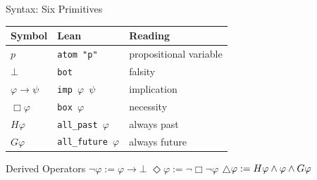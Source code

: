 \documentclass[aspectratio=169,11pt]{beamer}
\newcommand{\nec}{\Box}
\newcommand{\poss}{\Diamond}
\newcommand{\allpast}{H}
\newcommand{\allfuture}{G}
\newcommand{\always}{\ensuremath \raisebox{-1.3pt}{$\triangle$}}
\newcommand{\imp}{\rightarrow}
\newcommand{\falsum}{\bot}
\begin{document}
\begin{frame}{Syntax: Six Primitives}

\begin{center}
\begin{tabular}{lll}
\toprule
\textbf{Symbol} & \textbf{Lean} & \textbf{Reading} \\
\midrule
$p$ & \texttt{atom "p"} & propositional variable \\
$\falsum$ & \texttt{bot} & falsity \\
$\varphi \imp \psi$ & \texttt{imp $\varphi$ $\psi$} & implication \\
$\nec\varphi$ & \texttt{box $\varphi$} & necessity \\
$\allpast\varphi$ & \texttt{all\_past $\varphi$} & always past \\
$\allfuture\varphi$ & \texttt{all\_future $\varphi$} & always future \\
\bottomrule
\end{tabular}
\end{center}

\vspace{0.5cm}

\begin{block}{Derived Operators}
$\neg\varphi := \varphi \imp \falsum$ \quad
$\poss\varphi := \neg\nec\neg\varphi$ \quad
$\always\varphi := \allpast\varphi \land \varphi \land \allfuture\varphi$
\end{block}

\end{frame}
\end{document}
